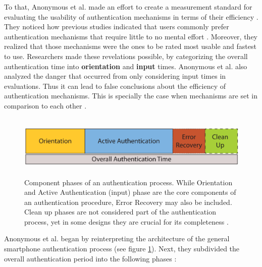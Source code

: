 To that, Anonymous et al. made an effort to create a measurement standard for evaluating the usability of authentication mechanisms in terms of their efficiency \cite{anonymous}. They noticed how previous studies indicated that users commonly prefer authentication mechanisms that require little to no mental effort \cite{anonymous, AnatomySmartphone}. Moreover, they realized that those mechanisms were the ones to be rated most usable and fastest to use. Researchers made these revelations possible, by categorizing the overall authentication time into \textbf{orientation} and \textbf{input} times. Anonymous et al. also analyzed the danger that occurred from only considering input times in evaluations. Thus it can lead to false conclusions about the efficiency of authentication mechanisms. This is specially the case when mechanisms are set in comparison to each other \cite{anonymous}. \\

\begin{figure}[t!]
\centering
\includegraphics[width=15cm, height=3cm]{Chapters/graphics/Phases.PNG}
\caption{Component phases of an authentication process. While Orientation and Active Authentication (input) phase are the core components of an authentication procedure, Error Recovery may also be included. Clean up phases are not considered part of the authentication process, yet in some designs they are crucial for its completeness \cite{anonymous}. }
\label{fig:phases}
\end{figure}

Anonymous et al. began by reinterpreting the architecture of the general smartphone authentication process (see figure \ref{fig:phases}). Next, they subdivided the overall authentication period into the following phases \cite{anonymous}: 

